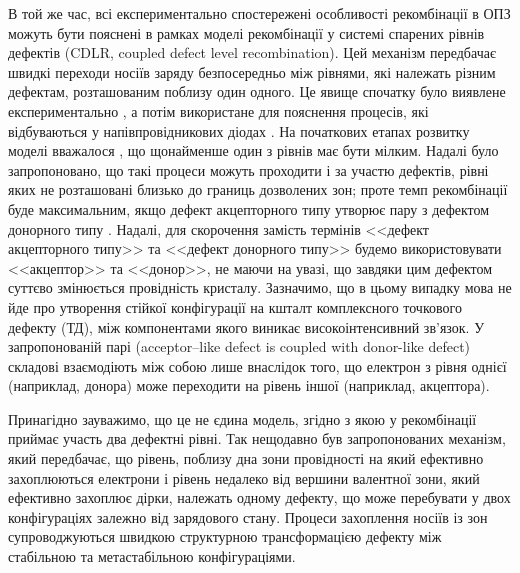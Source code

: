 В той же час, всі експериментально спостережені особливості рекомбінації в ОПЗ можуть бути пояснені в рамках
моделі рекомбінації у системі спарених рівнів дефектів (CDLR, coupled defect level recombination).
Цей механізм передбачає швидкі переходи носіїв заряду безпосередньо між рівнями, які належать різним дефектам,
розташованим поблизу один одного.
Це явище спочатку було виявлене експериментально \cite{DAPR:Chen1991,DAPR:Chen1994},
а потім використане для пояснення процесів, які відбуваються у напівпровідникових діодах \cite{CDLR:JAP1995,CDLR:JAP,CDLR:SSP}.
На початкових етапах розвитку моделі вважалося \cite{CDLR:JAP1995}, що щонайменше один з рівнів має бути
мілким.
Надалі було запропоновано, що такі процеси можуть проходити і за участю дефектів, рівні яких не розташовані близько до границь дозволених зон;
проте темп рекомбінації буде максимальним, якщо дефект акцепторного типу утворює пару з дефектом донорного типу \cite{CDLR:JAP}.
Надалі, для скорочення замість термінів <<дефект акцепторного типу>> та <<дефект донорного типу>>
будемо використовувати <<акцептор>> та <<донор>>, не маючи на увазі, що завдяки цим дефектом суттєво змінюється провідність кристалу.
Зазначимо, що в цьому випадку мова не йде про утворення стійкої конфігурації на кшталт комплексного точкового дефекту (ТД),
між компонентами якого виникає високоінтенсивний зв'язок.
У запропонованій парі (acceptor--like defect is coupled with donor-like defect) складові взаємодіють
між собою лише внаслідок того, що електрон з рівня однієї (наприклад, донора) може переходити на рівень іншої (наприклад, акцептора).

Принагідно зауважимо, що це не єдина модель, згідно з якою у рекомбінації приймає участь два
дефектні рівні.
Так нещодавно \cite{TwoLevelRecomb} був запропонованих механізм, який передбачає, що рівень, поблизу дна зони провідності
на який ефективно захоплюються електрони і рівень недалеко від вершини валентної зони, який ефективно захоплює дірки,
належать одному дефекту, що може перебувати у двох конфігураціях залежно від зарядового стану.
Процеси захоплення носіїв із зон супроводжуються швидкою структурною трансформацією дефекту між стабільною та метастабільною конфігураціями.

